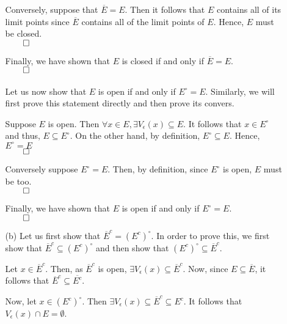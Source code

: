 \documentclass[11pt]{article}
\begin{document}
\begin{itemize}
\begin{itemize}
                Conversely, suppose that $\overline{E} = E$. Then it follows
                that $E$ contains all of its limit points since $\overline{E}$
                contains all of the limit points of $E$. Hence, $E$ must be
                closed.\\
                $\qed$
                
                Finally, we have shown that $E$ is closed if and only if
                $\overline{E} = E$.\\
                $\qed$
                \\
                \\
                Let us now show that $E$ is open if and only if $E^\circ = E$.
                Similarly, we will first prove this statement directly and then
                prove its convers.

                Suppose $E$ is open. Then $\forall x \in E, \exists
                V_\epsilon(x) \subseteq E$. It follows that $x \in E^\circ$ and
                thus, $E \subseteq E^\circ$. On the other hand, by definition,
                $E^\circ \subseteq E$. Hence, $E^\circ = E$\\
                $\qed$

                Conversely suppose $E^\circ = E$. Then, by definition, since
                $E^\circ$ is open, $E$ must be too.\\
                $\qed$

                Finally, we have shown that $E$ is open if and only if $E^\circ
                = E$.\\
                $\qed$

            \item[(b)]
                Let us first show that $\overline{E}^c = (E^c)^\circ$. In order
                to prove this, we first show that $\overline{E}^c \subseteq
                (E^c)^\circ$ and then show that $(E^c)^\circ \subseteq
                \overline{E}^c$.

                Let $x \in \overline{E}^c$. Then, as $\overline{E}^c$ is open,
                $\exists V_{\epsilon}(x) \subseteq \overline{E}^c$. Now, since
                $E \subseteq \overline{E}$, it follows that $\overline{E}^c
                \subseteq \overline{E^c}$.

                Now, let $x \in (E^c)^\circ$. Then $\exists V_\epsilon(x)
                \subseteq \overline{E}^c \subseteq E^c$. It follows that
                $V_\epsilon(x) \cap E = \emptyset$.


\end{itemize}
\end{itemize}
\end{document}
